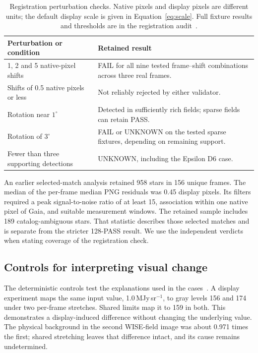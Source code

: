 \documentclass[11pt,letterpaper]{article}
\begin{document}
\begin{table}[htbp]
 \caption{Registration perturbation checks. Native pixels and display pixels are different units; the default display scale is given in Equation~\ref{eq:scale}. Full fixture results and thresholds are in the registration audit~\cite{registration}.}
 \label{tab:controls}
 \small\centering
 \begin{tabularx}{\linewidth}{@{}L{.27\linewidth}X@{}}
 \toprule
 \textbf{Perturbation or condition}&\textbf{Retained result}\\, 2 and 5 native-pixel shifts & FAIL for all nine tested frame--shift combinations across three real frames.\\
 Shifts of 0.5 native pixels or less & Not reliably rejected by either validator.\\
 Rotation near $1^\circ$ & Detected in sufficiently rich fields; sparse fields can retain PASS.\\
 Rotation of $3^\circ$ & FAIL or UNKNOWN on the tested sparse fixtures, depending on remaining support.\\
 Fewer than three supporting detections & UNKNOWN, including the Epsilon D6 case.\\\bottomrule
 \end{tabularx}
\end{table}

An earlier selected-match analysis retained 958 stars in 156 unique frames. The median of the per-frame median PNG residuals was 0.45 display pixels. Its filters required a peak signal-to-noise ratio of at least 15, association within one native pixel of Gaia, and suitable measurement windows. The retained sample includes 189 catalog-ambiguous stars. That statistic describes those selected matches and is separate from the stricter 128-PASS result. We use the independent verdicts when stating coverage of the registration check.

\subsection{Controls for interpreting visual change}
The deterministic controls test the explanations used in the cases~\cite{controls}. A display experiment maps the same input value, 1.0\,MJy\,sr$^{-1}$, to gray levels 156 and 174 under two per-frame stretches. Shared limits map it to 159 in both. This demonstrates a display-induced difference without changing the underlying value. The physical background in the second WISE-field image was about 0.971 times the first; shared stretching leaves that difference intact, and its cause remains undetermined.
\end{document}
